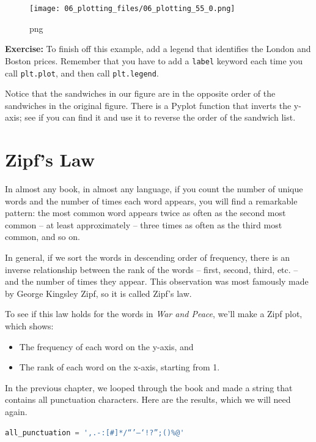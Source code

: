 \documentclass[
]{book}
\newcommand{\passthrough}[1]{#1}
\begin{document}
\begin{figure}
\centering
\texttt{[image: 06\_plotting\_files/06\_plotting\_55\_0.png]}
\caption{png}
\end{figure}

\textbf{Exercise:} To finish off this example, add a legend that
identifies the London and Boston prices. Remember that you have to add a
\passthrough{\lstinline!label!} keyword each time you call
\passthrough{\lstinline!plt.plot!}, and then call
\passthrough{\lstinline!plt.legend!}.

Notice that the sandwiches in our figure are in the opposite order of
the sandwiches in the original figure. There is a Pyplot function that
inverts the y-axis; see if you can find it and use it to reverse the
order of the sandwich list.

\section{Zipf's Law}\label{zipfs-law}

In almost any book, in almost any language, if you count the number of
unique words and the number of times each word appears, you will find a
remarkable pattern: the most common word appears twice as often as the
second most common -- at least approximately -- three times as often as
the third most common, and so on.

In general, if we sort the words in descending order of frequency, there
is an inverse relationship between the rank of the words -- first,
second, third, etc. -- and the number of times they appear. This
observation was most famously made by George Kingsley Zipf, so it is
called Zipf's law.

To see if this law holds for the words in \emph{War and Peace}, we'll
make a Zipf plot, which shows:

\begin{itemize}
\item
  The frequency of each word on the y-axis, and
\item
  The rank of each word on the x-axis, starting from 1.
\end{itemize}

In the previous chapter, we looped through the book and made a string
that contains all punctuation characters. Here are the results, which we
will need again.

\begin{lstlisting}[language=Python]
all_punctuation = ',.-:[#]*/“’—‘!?”;()%@'
\end{lstlisting}
\end{document}
